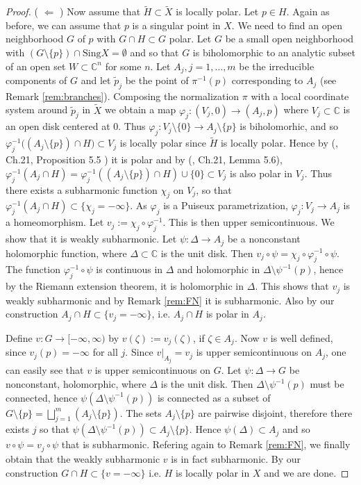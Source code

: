 \documentclass[11pt]{amsart}
\theoremstyle{definition}
\newcommand{\bC}{{\mathbb C}}
\begin{document}
\begin{proof}
( $\Longleftarrow$ )
Now assume that $\widetilde H\subset\widetilde X$ is locally polar. Let $p\in H$.
Again as before, we can assume that $p$ is a singular point in $X$. We need to find an open neighborhood  $G$ of $p$  with $ G\cap H\subset  G$  polar. Let $G$ be  a small open neighborhood with $(G\setminus \{p\})\cap \text{Sing} X=\emptyset$ and so that $G$ is biholomorphic to an analytic subset of an open set $W\subset\bC^n$ for some  $n$. Let $A_j, j=1,\dots, m$ be the irreducible components of $ G$ and let $\tilde{p}_j$ be the point of $\pi^{-1}(p)$ corresponding to $A_j$ (see Remark \ref{rem:branches}). Composing the normalization $\pi$ with a local coordinate system around $\tilde{p}_j$ in $\widetilde{X}$ we obtain a map $\varphi_j:(V_j,0)\rightarrow (A_j,p)$ where $V_j\subset\bC$ is an open disk centered at $0$. Thus $\varphi_j:V_j\setminus\{0\}\rightarrow A_j\setminus\{p\}$ is biholomorhic, and so $\varphi^{-1}_j\big((A_j\setminus\{p\})\cap H\big)\subset V_j$ is locally polar since $\widetilde{H}$ is locally polar. Hence by (\cite{C95}, Ch.21, Proposition 5.5 ) it is polar and by
(\cite{C95}, Ch.21, Lemma 5.6), 
 $\varphi_j^{-1}(A_j \cap H) = \varphi^{-1}_j((A_j\setminus\{p\})\cap H) \cup \{0\} \subset V_j$
 is also polar in $V_j$. Thus there exists a subharmonic function $\chi_j$ on $V_j$, so that $\varphi^{-1}_j(A_j\cap H)\subset\{\chi_j=-\infty\}$. As $\varphi_j$ is a Puiseux parametrization, $\varphi_j:V_j\rightarrow A_j$ is a homeomorphism.
 Let $v_j:=\chi_j\circ\varphi^{-1}_j$.
 This is then upper semicontinuous. We show that it is weakly subharmonic.
 Let $\psi:\Delta \rightarrow A_j$ be a nonconstant holomorphic function, where $\Delta \subset\bC$ is the unit disk. Then $v_j\circ\psi=\chi_j\circ\varphi^{-1}_j\circ\psi$. The function $\varphi^{-1}_j\circ\psi$ is continuous
 in $\Delta$ and holomorphic in $\Delta \setminus\psi^{-1}(p)$, hence by the Riemann extension theorem, it is holomorphic in $\Delta$. This shows that $v_j$ is weakly subharmonic and by  Remark \ref{rem:FN} it is subharmonic. Also by our construction
 $A_j\cap H\subset\{v_j=-\infty\}$, i.e. $A_j\cap H$ is polar in $A_j$.

 Define $v:G\rightarrow [-\infty,\infty)$ by $v(\zeta):=v_j(\zeta)$, if $\zeta\in A_j$. Now $v$ is well defined, since $v_j(p)=-\infty$ for all $j$. Since
 $\left.v\right|_{A_j}=v_j$ is upper semicontinuous on $A_j$, one can easily see that $v$ is upper semicontinuous on $ G$. Let $\psi:\Delta \rightarrow  G$ be nonconstant, holomorphic, where $\Delta$ is the unit disk. Then $\Delta \setminus\psi^{-1}(p)$ must be connected, hence $\psi(\Delta \setminus\psi^{-1}(p))$ is connected as a subset of $ G\setminus\{p\}=\bigsqcup^m_{j=1}(A_j\setminus\{p\})$. The sets $A_j\setminus\{p\}$ are pairwise disjoint, therefore there exists  $j$ so that $\psi(\Delta \setminus\psi^{-1}(p))\subset A_j\setminus\{p\}$. Hence $\psi(\Delta )\subset A_j$ and so $v\circ\psi=v_j\circ\psi$ that is subharmonic. Refering again  to Remark \ref{rem:FN}, we finally obtain that the weakly subharmonic $v$ is in fact subharmonic. By our construction $ G\cap H\subset\{v=-\infty\}$ i.e. $H$ is locally polar in $X$ and we are done.
\end{proof}
\end{document}

